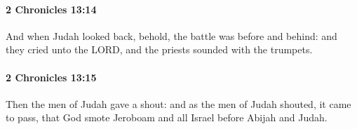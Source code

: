 		\paragraph{2 Chronicles 13:14} %
			\label{2CHRONICLES-13-14}

			And when Judah looked back, behold, the battle was before and behind: and they cried unto the LORD, and the priests sounded with the trumpets.


		\paragraph{2 Chronicles 13:15} %
			\label{2CHRONICLES-13-15}

			Then the men of Judah gave a shout: and as the men of Judah shouted, it came to pass, that God smote Jeroboam and all Israel before Abijah and Judah.


